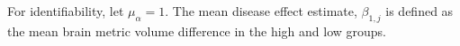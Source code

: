 For identifiability, let $\mu_{\alpha} = 1$. The mean disease effect estimate, $\beta_{1,j}$ is defined as the mean brain metric volume difference in the high and low groups.